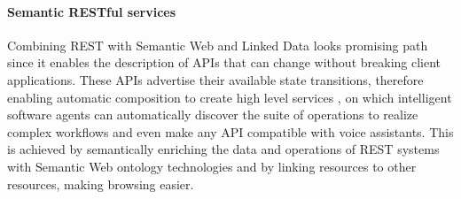 

\paragraph{Semantic RESTful services}
Combining REST with Semantic Web and Linked Data looks promising path since  it enables the description of APIs that can change without breaking client applications. These APIs advertise their available state transitions, therefore enabling automatic composition to create high level services \cite{alarcon2015rest}, on which intelligent software agents can automatically discover the suite of operations to realize complex workflows and even make any API compatible with voice assistants. This is achieved by semantically enriching the data and operations of REST systems with Semantic Web ontology technologies and by linking resources to other resources, making browsing easier.




